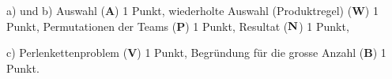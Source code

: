 \begin{bewertung}
\begin{teilaufgaben}
\item[a) und b)]
Auswahl ({\bf A}) 1 Punkt,
wiederholte Auswahl (Produktregel) ({\bf W}) 1 Punkt,
Permutationen der Teams ({\bf P}) 1 Punkt,
Resultat ($\text{\bf N}$) 1 Punkt,
\item[c)]
Perlenkettenproblem ({\bf V}) 1 Punkt,
Begründung für die grosse Anzahl ({\bf B}) 1 Punkt.
\end{teilaufgaben}
\end{bewertung}




